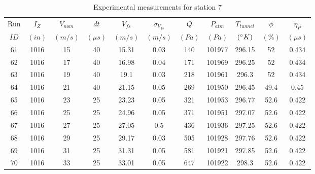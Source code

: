 \begin{table}[H]
\begin{center}
\begin{tabular}{|ccccccccccc|}
	\hline
	Run & $I_Z$ & $V_{nom}$ & $dt$ & $V_{fs}$ & $\sigma_{V_{fs}}$ & $Q$ & $P_{atm}$ & $T_{tunnel}$ & $\phi$ & $\eta_P$\\
	$ID$ & $(in)$ & $(m/s)$ & $(\mu s)$ & $(m/s)$ & $(m/s)$ & $(Pa)$ & $(Pa)$ & $(\degree K)$ & $(\%)$ & $(\mu s)$\\
	\hline
	61 & 1016 & 15 & 40 & 15.31 & 0.03 & 140 & 101977 & 296.15 & 52 & 0.434\\
	62 & 1016 & 17 & 40 & 16.98 & 0.04 & 171 & 101969 & 296.25 & 52 & 0.434\\
	63 & 1016 & 19 & 40 & 19.1 & 0.03 & 218 & 101961 & 296.3 & 52 & 0.434\\
	64 & 1016 & 21 & 40 & 21.15 & 0.05 & 269 & 101950 & 296.45 & 49.4 & 0.45\\
	65 & 1016 & 23 & 25 & 23.23 & 0.05 & 321 & 101953 & 296.77 & 52.6 & 0.422\\
	66 & 1016 & 25 & 25 & 24.96 & 0.05 & 371 & 101951 & 297.07 & 52.6 & 0.422\\
	67 & 1016 & 27 & 25 & 27.05 & 0.5 & 436 & 101936 & 297.25 & 52.6 & 0.422\\
	68 & 1016 & 29 & 25 & 29.17 & 0.03 & 505 & 101928 & 297.76 & 52.6 & 0.422\\
	69 & 1016 & 31 & 25 & 31.31 & 0.05 & 581 & 101921 & 297.85 & 52.6 & 0.422\\
	70 & 1016 & 33 & 25 & 33.01 & 0.05 & 647 & 101922 & 298.3 & 52.6 & 0.422\\
	\hline
\end{tabular}
\caption{Experimental measurements for station 7}
\label{table:station_7_measurements}
\end{center}
\end{table}
